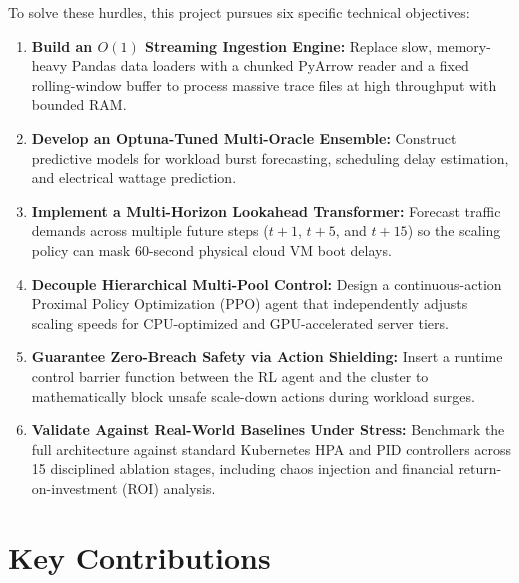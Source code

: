 \documentclass[12pt]{report}
\begin{document}
To solve these hurdles, this project pursues six specific technical objectives:
\begin{enumerate}[label=\textbf{O\arabic*.}]
\item \textbf{Build an $O(1)$ Streaming Ingestion Engine:} Replace slow, memory-heavy Pandas data loaders with a chunked PyArrow reader and a fixed rolling-window buffer to process massive trace files at high throughput with bounded RAM.
\item \textbf{Develop an Optuna-Tuned Multi-Oracle Ensemble:} Construct predictive models for workload burst forecasting, scheduling delay estimation, and electrical wattage prediction.
\item \textbf{Implement a Multi-Horizon Lookahead Transformer:} Forecast traffic demands across multiple future steps ($t+1$, $t+5$, and $t+15$) so the scaling policy can mask 60-second physical cloud VM boot delays.
\item \textbf{Decouple Hierarchical Multi-Pool Control:} Design a continuous-action Proximal Policy Optimization (PPO) agent that independently adjusts scaling speeds for CPU-optimized and GPU-accelerated server tiers.
\item \textbf{Guarantee Zero-Breach Safety via Action Shielding:} Insert a runtime control barrier function between the RL agent and the cluster to mathematically block unsafe scale-down actions during workload surges.
\item \textbf{Validate Against Real-World Baselines Under Stress:} Benchmark the full architecture against standard Kubernetes HPA and PID controllers across 15 disciplined ablation stages, including chaos injection and financial return-on-investment (ROI) analysis.
\end{enumerate}

\section{Key Contributions}
\end{document}
